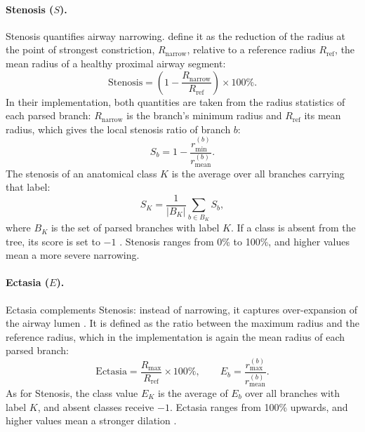 \paragraph{Stenosis ($S$).}              %
Stenosis quantifies airway narrowing. \citet{zhang2025airmorph} define it as the reduction of
the radius at the point of strongest constriction, $R_{\mathrm{narrow}}$, relative to a
reference radius $R_{\mathrm{ref}}$, the mean radius of a healthy proximal airway segment:
\begin{equation}
  \mathrm{Stenosis} = \left(1 - \frac{R_{\mathrm{narrow}}}{R_{\mathrm{ref}}}\right)
  \times 100\%.
  \label{eq:morph_stenosis_def}          %
\end{equation}
In their implementation, both quantities are taken from the radius statistics of each
parsed branch: $R_{\mathrm{narrow}}$ is the branch's minimum radius and $R_{\mathrm{ref}}$
its mean radius, which gives the local stenosis ratio of branch $b$:
\begin{equation}
  S_b = 1 - \frac{r^{(b)}_{\min}}{r^{(b)}_{\mathrm{mean}}}.
  \label{eq:morph_stenosis_branch}       %
\end{equation}
The stenosis of an anatomical class $K$ is the average over all branches carrying that label:
\begin{equation}
  S_K = \frac{1}{|B_K|} \sum_{b \in B_K} S_b,
  \label{eq:morph_stenosis_class}        %
\end{equation}
where $B_K$ is the set of parsed branches with label $K$. If a class is absent from the tree,
its score is set to $-1$ \cite{zhang2025airmorph}. Stenosis ranges from 0\% to 100\%, and
higher values mean a more severe narrowing.

\paragraph{Ectasia ($E$).}               %
Ectasia complements Stenosis: instead of narrowing, it captures over-expansion of the airway
lumen \cite{zhang2025airmorph}. It is defined as the ratio between the maximum radius and the
reference radius, which in the implementation is again the mean radius of each parsed branch:
\begin{equation}
  \mathrm{Ectasia} = \frac{R_{\max}}{R_{\mathrm{ref}}} \times 100\%,
  \qquad
  E_b = \frac{r^{(b)}_{\max}}{r^{(b)}_{\mathrm{mean}}}.
  \label{eq:morph_ectasia}               %
\end{equation}
As for Stenosis, the class value $E_K$ is the average of $E_b$ over all branches with label
$K$, and absent classes receive $-1$. Ectasia ranges from 100\% upwards, and higher values
mean a stronger dilation \cite{zhang2025airmorph}.

